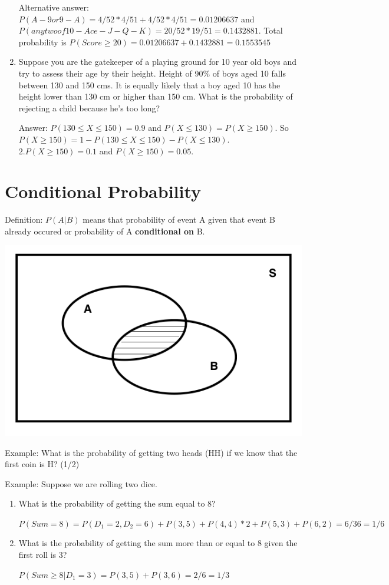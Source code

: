 \documentclass[]{book}
\theoremstyle{definition}
\theoremstyle{definition}
\theoremstyle{definition}
\theoremstyle{remark}
\begin{document}
\begin{enumerate}
  Alternative answer:
  \(P(A-9 or 9-A) = 4/52*4/51 + 4/52*4/51 = 0.01206637\) and
  \(P(any two of 10-Ace-J-Q-K) = 20/52 * 19/51 = 0.1432881\). Total
  probability is
  \(P(Score \ge 20) = 0.01206637 + 0.1432881 = 0.1553545\)
\item
  Suppose you are the gatekeeper of a playing ground for 10 year old
  boys and try to assess their age by their height. Height of 90\% of
  boys aged 10 falls between 130 and 150 cms. It is equally likely that
  a boy aged 10 has the height lower than 130 cm or higher than 150 cm.
  What is the probability of rejecting a child because he's too long?

  Answer: \(P(130 \le X \le 150) = 0.9\) and
  \(P(X \le 130) = P(X \ge 150)\). So
  \(P(X \ge 150) = 1 - P(130 \le X \le 150) - P(X \le 130)\).
  \(2.P(X \ge 150) = 0.1\) and \(P(X \ge 150) = 0.05\).
\end{enumerate}

\hypertarget{conditional-probability}{%
\section{Conditional Probability}\label{conditional-probability}}

Definition: \(P(A|B)\) means that probability of event A given that
event B already occured or probability of A \textbf{conditional on} B.

\includegraphics{img/cond1.png}

Example: What is the probability of getting two heads (HH) if we know
that the first coin is H? (1/2)

Example: Suppose we are rolling two dice.

\begin{enumerate}
\def\labelenumi{\alph{enumi}.}
\item
  What is the probability of getting the sum equal to 8?

  \(P(Sum = 8) = P(D_1 = 2, D_2 = 6) + P({3,5}) + P({4,4})*2 + P({5,3}) + P({6,2}) = 6/36 = 1/6\)
\item
  What is the probability of getting the sum more than or equal to 8
  given the first roll is 3?

  \(P(Sum \ge 8 | D_1 = 3) = P({3,5}) + P({3,6}) = 2/6 = 1/3\)
\end{enumerate}
\end{document}
